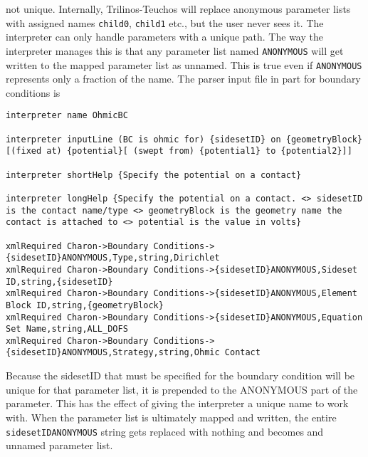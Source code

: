 not unique.  Internally, Trilinos-Teuchos will replace anonymous
parameter lists with assigned names \texttt{child0}, \texttt{child1}
etc., but the user never sees it.  The interpreter can only handle
parameters with a unique path.  The way the interpreter manages this
is that any parameter list named \texttt{ANONYMOUS} will get written
to the mapped parameter list as unnamed.  This is true even if
\texttt{ANONYMOUS} represents only a fraction of the name.  The parser
input file in part for boundary conditions is
\begin{lstlisting}
interpreter name OhmicBC

interpreter inputLine (BC is ohmic for) {sidesetID} on {geometryBlock} [(fixed at) {potential}[ (swept from) {potential1} to {potential2}]]

interpreter shortHelp {Specify the potential on a contact}

interpreter longHelp {Specify the potential on a contact. <> sidesetID is the contact name/type <> geometryBlock is the geometry name the contact is attached to <> potential is the value in volts}

xmlRequired Charon->Boundary Conditions->{sidesetID}ANONYMOUS,Type,string,Dirichlet
xmlRequired Charon->Boundary Conditions->{sidesetID}ANONYMOUS,Sideset ID,string,{sidesetID}
xmlRequired Charon->Boundary Conditions->{sidesetID}ANONYMOUS,Element Block ID,string,{geometryBlock}
xmlRequired Charon->Boundary Conditions->{sidesetID}ANONYMOUS,Equation Set Name,string,ALL_DOFS
xmlRequired Charon->Boundary Conditions->{sidesetID}ANONYMOUS,Strategy,string,Ohmic Contact
\end{lstlisting}
Because the sidesetID that must be specified for the boundary
condition will be unique for that parameter list, it is prepended to
the ANONYMOUS part of the parameter.  This has the effect of giving
the interpreter a unique name to work with.  When the parameter list
is ultimately mapped and written, the entire
\texttt{{sidesetID}ANONYMOUS} string gets replaced with nothing and
becomes and unnamed parameter list.


